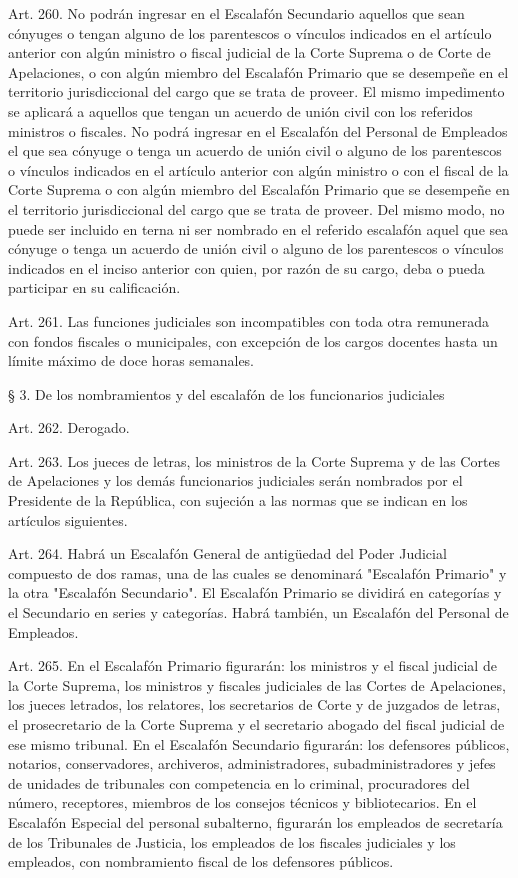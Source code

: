     Art. 260. No podrán ingresar en el Escalafón Secundario aquellos que sean cónyuges o tengan alguno de los parentescos o vínculos indicados en el artículo anterior con algún ministro o fiscal judicial de la Corte Suprema o de Corte de Apelaciones, o con algún miembro del Escalafón Primario que se desempeñe en el territorio jurisdiccional del cargo que se trata de proveer. El mismo impedimento se aplicará a aquellos que tengan un acuerdo de unión civil con los referidos ministros o fiscales.
    No podrá ingresar en el Escalafón del Personal de Empleados el que sea cónyuge o tenga un acuerdo de unión civil o alguno de los parentescos o vínculos indicados en el artículo anterior con algún ministro o con el fiscal de la Corte Suprema o con algún miembro del Escalafón Primario que se desempeñe en el territorio jurisdiccional del cargo que se trata de proveer.
    Del mismo modo, no puede ser incluido en terna ni ser nombrado en el referido escalafón aquel que sea cónyuge o tenga un acuerdo de unión civil o alguno de los parentescos o vínculos indicados en el inciso anterior con quien, por razón de su cargo, deba o pueda participar en su calificación.


    Art. 261. Las funciones judiciales son incompatibles con toda otra remunerada con fondos fiscales o municipales, con excepción de los cargos docentes hasta un límite máximo de doce horas semanales.


    § 3. De los nombramientos y del escalafón de los funcionarios judiciales

    Art. 262. Derogado.



    Art. 263. Los jueces de letras, los ministros de la Corte Suprema y de las Cortes de Apelaciones y los demás funcionarios judiciales serán nombrados por el Presidente de la República, con sujeción a las normas que se indican en los artículos siguientes.



    Art. 264. Habrá un Escalafón General de antigüedad del Poder Judicial compuesto de dos ramas, una de las cuales se denominará "Escalafón Primario" y la otra "Escalafón Secundario".
    El Escalafón Primario se dividirá en categorías y el Secundario en series y categorías.
    Habrá también, un Escalafón del Personal de Empleados.



    Art. 265. En el Escalafón Primario figurarán: los ministros y el fiscal judicial de la Corte Suprema, los ministros y fiscales judiciales de las Cortes de Apelaciones, los jueces letrados, los relatores, los secretarios de Corte y de juzgados de letras, el prosecretario de la Corte Suprema y el secretario abogado del fiscal judicial de ese mismo tribunal.
    En el Escalafón Secundario figurarán: los defensores públicos, notarios, conservadores, archiveros, administradores, subadministradores y jefes de unidades de tribunales con competencia en lo criminal, procuradores del número, receptores, miembros de los consejos técnicos y bibliotecarios.
    En el Escalafón Especial del personal subalterno, figurarán los empleados de secretaría de los Tribunales de Justicia, los empleados de los fiscales judiciales y los empleados, con nombramiento fiscal de los defensores públicos.

